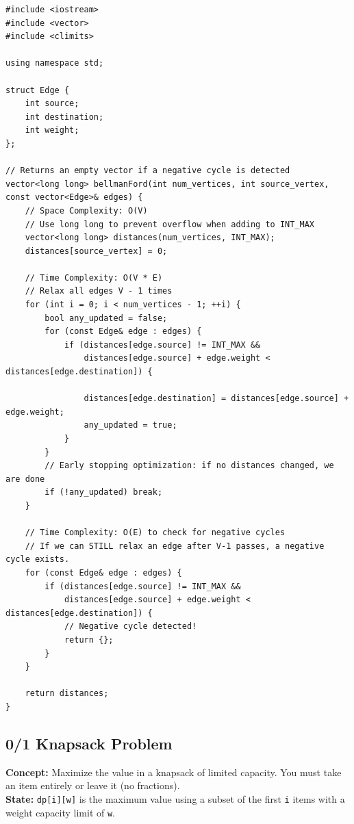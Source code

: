 \begin{lstlisting}
#include <iostream>
#include <vector>
#include <climits>

using namespace std;

struct Edge {
    int source;
    int destination;
    int weight;
};

// Returns an empty vector if a negative cycle is detected
vector<long long> bellmanFord(int num_vertices, int source_vertex, const vector<Edge>& edges) {
    // Space Complexity: O(V)
    // Use long long to prevent overflow when adding to INT_MAX
    vector<long long> distances(num_vertices, INT_MAX);
    distances[source_vertex] = 0;
    
    // Time Complexity: O(V * E)
    // Relax all edges V - 1 times
    for (int i = 0; i < num_vertices - 1; ++i) {
        bool any_updated = false;
        for (const Edge& edge : edges) {
            if (distances[edge.source] != INT_MAX && 
                distances[edge.source] + edge.weight < distances[edge.destination]) {
                
                distances[edge.destination] = distances[edge.source] + edge.weight;
                any_updated = true;
            }
        }
        // Early stopping optimization: if no distances changed, we are done
        if (!any_updated) break; 
    }
    
    // Time Complexity: O(E) to check for negative cycles
    // If we can STILL relax an edge after V-1 passes, a negative cycle exists.
    for (const Edge& edge : edges) {
        if (distances[edge.source] != INT_MAX && 
            distances[edge.source] + edge.weight < distances[edge.destination]) {
            // Negative cycle detected!
            return {}; 
        }
    }
    
    return distances;
}
\end{lstlisting}

\subsection{0/1 Knapsack Problem}
\textbf{Concept:} Maximize the value in a knapsack of limited capacity. You must take an item entirely or leave it (no fractions). \\
\textbf{State:} \texttt{dp[i][w]} is the maximum value using a subset of the first \texttt{i} items with a weight capacity limit of \texttt{w}.

